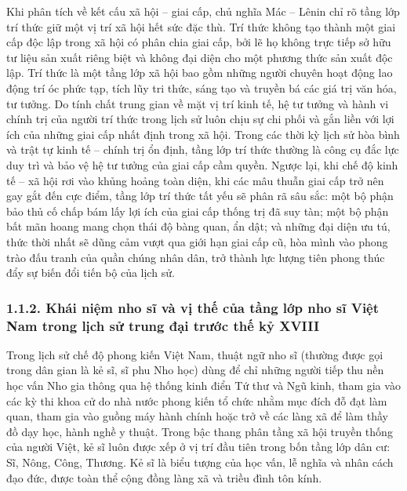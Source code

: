 Khi phân tích về kết cấu xã hội -- giai cấp, chủ nghĩa Mác -- Lênin chỉ rõ tầng lớp trí thức giữ một vị trí xã hội hết sức đặc thù. Trí thức không tạo thành một giai cấp độc lập trong xã hội có phân chia giai cấp, bởi lẽ họ không trực tiếp sở hữu tư liệu sản xuất riêng biệt và không đại diện cho một phương thức sản xuất độc lập. Trí thức là một tầng lớp xã hội bao gồm những người chuyên hoạt động lao động trí óc phức tạp, tích lũy tri thức, sáng tạo và truyền bá các giá trị văn hóa, tư tưởng. Do tính chất trung gian về mặt vị trí kinh tế, hệ tư tưởng và hành vi chính trị của người trí thức trong lịch sử luôn chịu sự chi phối và gắn liền với lợi ích của những giai cấp nhất định trong xã hội. Trong các thời kỳ lịch sử hòa bình và trật tự kinh tế -- chính trị ổn định, tầng lớp trí thức thường là công cụ đắc lực duy trì và bảo vệ hệ tư tưởng của giai cấp cầm quyền. Ngược lại, khi chế độ kinh tế -- xã hội rơi vào khủng hoảng toàn diện, khi các mâu thuẫn giai cấp trở nên gay gắt đến cực điểm, tầng lớp trí thức tất yếu sẽ phân rã sâu sắc: một bộ phận bảo thủ cố chấp bám lấy lợi ích của giai cấp thống trị đã suy tàn; một bộ phận bất mãn hoang mang chọn thái độ bàng quan, ẩn dật; và những đại diện ưu tú, thức thời nhất sẽ dũng cảm vượt qua giới hạn giai cấp cũ, hòa mình vào phong trào đấu tranh của quần chúng nhân dân, trở thành lực lượng tiên phong thúc đẩy sự biến đổi tiến bộ của lịch sử.

\subsubsection*{1.1.2. Khái niệm nho sĩ và vị thế của tầng lớp nho sĩ Việt Nam trong lịch sử trung đại trước thế kỷ XVIII}

Trong lịch sử chế độ phong kiến Việt Nam, thuật ngữ nho sĩ (thường được gọi trong dân gian là kẻ sĩ, sĩ phu Nho học) dùng để chỉ những người tiếp thu nền học vấn Nho gia thông qua hệ thống kinh điển Tứ thư và Ngũ kinh, tham gia vào các kỳ thi khoa cử do nhà nước phong kiến tổ chức nhằm mục đích đỗ đạt làm quan, tham gia vào guồng máy hành chính hoặc trở về các làng xã để làm thầy đồ dạy học, hành nghề y thuật. Trong bậc thang phân tầng xã hội truyền thống của người Việt, kẻ sĩ luôn được xếp ở vị trí đầu tiên trong bốn tầng lớp dân cư: Sĩ, Nông, Công, Thương. Kẻ sĩ là biểu tượng của học vấn, lễ nghĩa và nhân cách đạo đức, được toàn thể cộng đồng làng xã và triều đình tôn kính.

